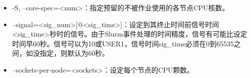 \begin{itemize}
    \item -S, --core-spec=<num>：指定预留的不被作业使用的各节点CPU核数。
    \item --signal=<sig\_num>[@<sig\_time>]：设定到其终止时间前信号时间<sig\_time>秒时的信号。由于Slurm事件处理的时间精度，信号有可能比设定时间早60秒。信号可以为10或USER1，信号时间sig\_time必须在0到65535之间，如没指定，则默认为60秒。
    \item  --sockets-per-node=<sockets>：设定每个节点的CPU颗数。

\end{itemize}
